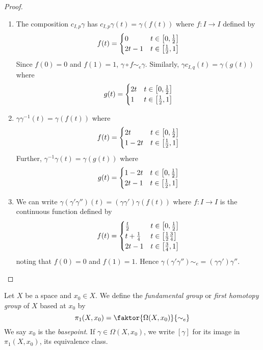 \begin{proof}
	\begin{enumerate}
		\item The composition \( c_{I,p} \gamma \) has \( c_{I,p} \gamma (t) = \gamma(f(t)) \) where \( f \colon I \to I \) defined by
			\[ f(t) = \begin{cases}
				0 & t \in \qty[0,\frac 12] \\
				2t - 1 & t \in \qty[\frac 12, 1]
			\end{cases} \]
			Since \( f(0) = 0 \) and \( f(1) = 1 \), \( \gamma \circ f \sim_e \gamma \).
			Similarly, \( \gamma c_{I,q} (t) = \gamma(g(t)) \) where
			\[ g(t) = \begin{cases}
				2t & t \in \qty[0,\frac 12] \\
				1 & t \in \qty[\frac 12, 1]
			\end{cases} \]
		\item \( \gamma\gamma^{-1}(t) = \gamma(f(t)) \) where
			\[ f(t) = \begin{cases}
				2t & t \in \qty[0,\frac 12] \\
				1 - 2t & t \in \qty[\frac 12, 1]
			\end{cases} \]
			Further, \( \gamma^{-1}\gamma(t) = \gamma(g(t)) \) where
			\[ g(t) = \begin{cases}
				1 - 2t & t \in \qty[0,\frac 12] \\
				2t - 1 & t \in \qty[\frac 12, 1]
			\end{cases} \]
		\item We can write \( \gamma(\gamma'\gamma'')(t) = (\gamma\gamma')\gamma(f(t)) \) where \( f \colon I \to I \) is the continuous function defined by
			\[ f(t) = \begin{cases}
				\frac t2 & t \in \qty[0,\frac 12] \\
				t + \frac 14 & t \in \qty[\frac 12 \frac 34] \\
				2t - 1 & t \in \qty[\frac 34, 1]
			\end{cases} \]
			noting that \( f(0) = 0 \) and \( f(1) = 1 \).
			Hence \( \gamma(\gamma'\gamma'') \sim_e = (\gamma\gamma')\gamma'' \).
	\end{enumerate}
\end{proof}
\begin{definition}
	Let \( X \) be a space and \( x_0 \in X \).
	We define the \emph{fundamental group} or \emph{first homotopy group} of \( X \) based at \( x_0 \) by
	\[ \pi_1(X,x_0) = \faktor{\Omega(X,x_0)}{\sim_e} \]
	We say \( x_0 \) is the \emph{basepoint}.
	If \( \gamma \in \Omega(X,x_0) \), we write \( [\gamma] \) for its image in \( \pi_1(X,x_0) \), its equivalence class.
\end{definition}
